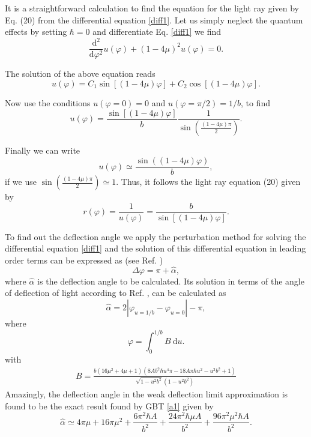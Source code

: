\documentclass[preprint,superscriptaddress,amsfonts,amssymb,amsmath,showpacs]{revtex4}
\begin{document}
It is a straightforward calculation to find the equation for the light ray given by Eq. (20) from the differential equation  \eqref{diff1}. Let us simply neglect the quantum effects by setting $\hbar=0$ and differentiate Eq. \eqref{diff1} we find 
\begin{equation}
\frac{\mathrm{d}^2}{\mathrm{d}\varphi^2}u(\varphi)+(1-4\mu)^2 u(\varphi)=0.
\end{equation}

The solution of the above equation reads
\begin{equation}
u(\varphi)=C_1 \sin\left[(1-4\mu)\varphi\right]+C_2 \cos\left[(1-4\mu) \varphi\right].
\end{equation}

Now use the conditions $u(\varphi=0)=0$ and $u(\varphi=\pi/2)=1/b$, to find
\begin{equation}
u(\varphi)=\frac{\sin\left[(1-4\mu) \varphi\right]}{b}\frac{1}{\sin\left(\frac{(1-4\mu) \pi}{2}    \right)}.
\end{equation}

Finally we can write
\begin{equation}
u(\varphi)\simeq \frac{\sin\left((1-4\mu) \varphi\right)}{b},
\end{equation}
if we use $\sin\left(\frac{(1-4\mu) \pi}{2}\right)\simeq 1 $. Thus, it follows the light ray equation (20) given by
\begin{equation}
r(\varphi)=\frac{1}{u(\varphi)}=\frac{b}{\sin\left[\left(1-4\mu\right) \varphi\right]}.
\end{equation}

To find out the deflection angle we apply the perturbation method for solving the differential equation \eqref{diff1} and the solution of this differential equation in leading order terms can be expressed as (see Ref.  \cite{Boyer,weinberg})
\begin{equation}
\Delta \varphi =\pi+\hat{\alpha},
\end{equation}
where $\hat{\alpha}$ is the deflection angle to be calculated. 
Its solution in terms of the angle of deflection of light 
according to Ref. \cite{weinberg}, can be calculated as
\begin{equation}
\hat{\alpha}=2|\varphi_{u=1/b}-\varphi_{u=0}|-\pi,
\end{equation}
where 
\begin{equation}
\varphi=\int_0^{1/b} B ~\mathrm{d}u.
\end{equation}
with
\begin{align*}
B = \frac{b \left( 16 \mu^2+4\mu+1  \right) \left(8Ab^2\hbar u^4 \pi-18 A \pi \hbar u^2-u^2 b^2+1   \right)}{\sqrt{1-u^2 b^2}(1-u^2 b^2)}
\end{align*}
Amazingly, the deflection angle in the weak deflection limit approximation is found to be the exact result found by GBT \eqref{a1} given by
\begin{equation}\label{dif00}
\hat{\alpha}\simeq 4 \pi \mu+ 16 \pi \mu^2+\frac{6 \pi^2 \hbar A}{b^2}+\frac{24 \pi^2 \hbar \mu A}{b^2}+\frac{96 \pi^2 \mu^2 \hbar A}{b^2}.
\end{equation}
\end{document}
